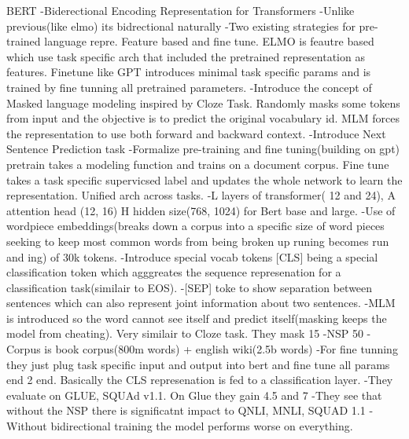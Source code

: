 BERT
-Biderectional Encoding Representation for Transformers
-Unlike previous(like elmo) its bidrectional naturally 
-Two existing strategies for pre-trained language repre. Feature based and fine tune. ELMO is feautre based which use task specific arch that included the pretrained representation as features. Finetune like GPT introduces minimal task specific params and is trained by fine tunning all pretrained parameters. 
-Introduce the concept of Masked language modeling inspired by Cloze Task. Randomly masks some tokens from input and the objective is to predict the original vocabulary id. MLM forces the representation to use both forward and backward context. 
-Introduce Next Sentence Prediction task 
-Formalize pre-training and fine tuning(building on gpt) pretrain takes a modeling function and trains on a document corpus. Fine tune takes a task specific supervicsed label and updates the whole network to learn the representation. Unified arch across tasks. 
-L layers of transformer( 12 and 24), A attention head (12, 16) H hidden size(768, 1024) for Bert base and large.
-Use of wordpiece embeddings(breaks down a corpus into a specific size of word pieces seeking to keep most common words from being broken up runing becomes run and ing) of 30k tokens. 
-Introduce  special vocab tokens [CLS] being a special classification token which agggreates the sequence represenation for a classification task(similair to EOS).
-[SEP] toke to show separation between sentences which can also represent joint information about two sentences. 
-MLM is introduced so the word cannot see itself and predict itself(masking keeps the model from cheating). Very similair to Cloze task. They mask 15%
-NSP 50%
-Corpus is book corpus(800m words) + english wiki(2.5b words)
-For fine tunning they just plug task specific input and output into bert and fine tune all params end 2 end. Basically the CLS represenation is fed to a classification layer. 
-They evaluate on GLUE, SQUAd v1.1. On Glue they gain 4.5 and 7%
-They see that without the NSP there is significatnt impact to QNLI, MNLI, SQUAD 1.1
-Without bidirectional training the model performs worse on everything. 
